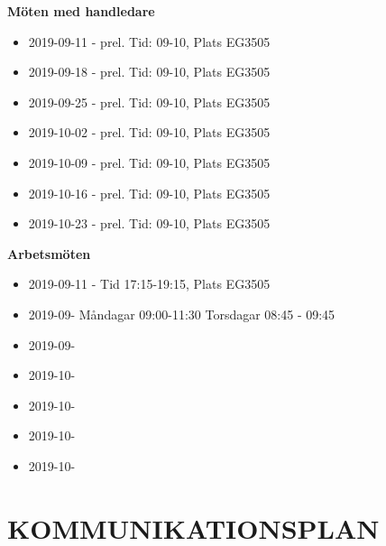 \documentclass[a4paper]{article}
\begin{document}
\textbf{Möten med handledare}
\begin{itemize}
	\item 2019-09-11 - prel. Tid: 09-10, Plats EG3505
	\item 2019-09-18 - prel. Tid: 09-10, Plats EG3505
	\item 2019-09-25 - prel. Tid: 09-10, Plats EG3505
	\item 2019-10-02 - prel. Tid: 09-10, Plats EG3505
	\item 2019-10-09 - prel. Tid: 09-10, Plats EG3505
	\item 2019-10-16 - prel. Tid: 09-10, Plats EG3505
	\item 2019-10-23 - prel. Tid: 09-10, Plats EG3505

\end{itemize}
\noindent
\textbf{Arbetsmöten}
\begin{itemize}
	\item 2019-09-11 - Tid 17:15-19:15, Plats EG3505
	\item 2019-09-  Måndagar 09:00-11:30 Torsdagar 08:45 - 09:45
	\item 2019-09-
	\item 2019-10-
	\item 2019-10-
	\item 2019-10-
	\item 2019-10-

\end{itemize}

\section{KOMMUNIKATIONSPLAN}
\label{sec:komm}
\end{document}
